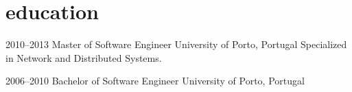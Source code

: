 \documentclass[]{friggeri-cv} %
\begin{document}

%
%





\section{education}

\begin{entrylist}


\entry
{2010--2013}
{Master {\normalfont of Software Engineer}}
{University of Porto, Portugal}
{Specialized in Network and Distributed Systems.}


\entry
{2006--2010}
{Bachelor {\normalfont of Software Engineer}}
{University of Porto, Portugal}
{}






\end{entrylist}
\end{document}
